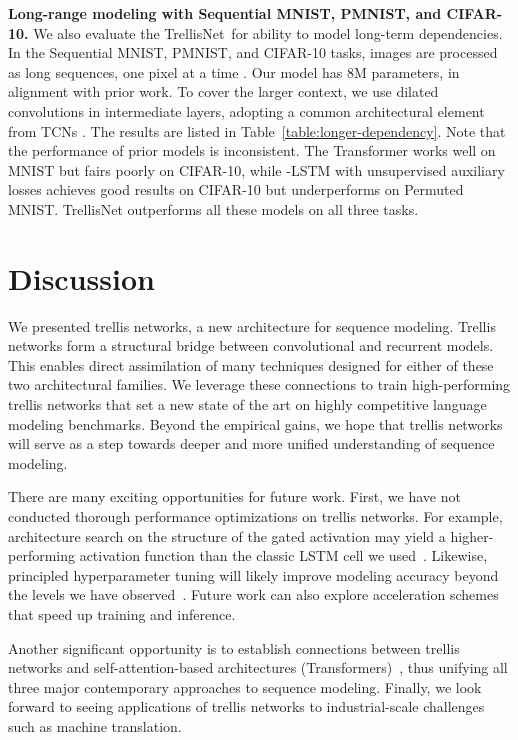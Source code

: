 \documentclass{article} \usepackage{iclr2019_conference,times}
\newcommand\mypara[1]{\vspace{0mm}\noindent\textbf{#1}}
\newcommand{\model}{TrellisNet}
\begin{document}
\mypara{Long-range modeling with Sequential MNIST, PMNIST, and CIFAR-10.}
We also evaluate the \model~for ability to model long-term dependencies. In the Sequential MNIST, PMNIST, and CIFAR-10 tasks, images are processed as long sequences, one pixel at a time \citep{chang2017dilated,bai2018empirical,trinh2018learning}. Our model has 8M parameters, in alignment with prior work. To cover the larger context, we use dilated convolutions in intermediate layers, adopting a common architectural element from TCNs \citep{dilatedConv,waveNet,bai2018empirical}.
The results are listed in Table~\ref{table:longer-dependency}. Note that the performance of prior models is inconsistent. The Transformer works well on MNIST but fairs poorly on CIFAR-10, while -LSTM with unsupervised auxiliary losses achieves good results on CIFAR-10 but underperforms on Permuted MNIST. TrellisNet outperforms all these models on all three tasks.


\section{Discussion}
\label{sec:discussion}

We presented trellis networks, a new architecture for sequence modeling. Trellis networks form a structural bridge between convolutional and recurrent models. This enables direct assimilation of many techniques designed for either of these two architectural families. We leverage these connections to train high-performing trellis networks that set a new state of the art on highly competitive language modeling benchmarks. Beyond the empirical gains, we hope that trellis networks will serve as a step towards deeper and more unified understanding of sequence modeling.

There are many exciting opportunities for future work. First, we have not conducted thorough performance optimizations on trellis networks. For example, architecture search on the structure of the gated activation  may yield a higher-performing activation function than the classic LSTM cell we used~\citep{zoph2017neural,pham2018efficient}. Likewise, principled hyperparameter tuning will likely improve modeling accuracy beyond the levels we have observed~\citep{Melis2018}. Future work can also explore acceleration schemes that speed up training and inference.

Another significant opportunity is to establish connections between trellis networks and self-attention-based architectures (Transformers)~\citep{vaswani2017attention,santoro2018relational,chen2018best}, thus unifying all three major contemporary approaches to sequence modeling. Finally, we look forward to seeing applications of trellis networks to industrial-scale challenges such as machine translation.
\end{document}
